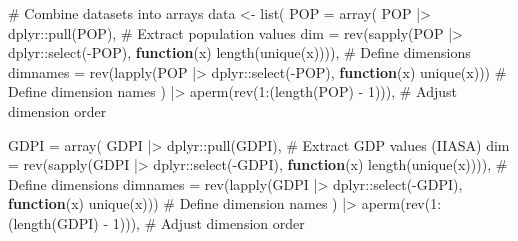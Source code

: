 \documentclass[
  letterpaper,
  DIV=11,
  numbers=noendperiod]{scrartcl}
\newenvironment{Shaded}{}{}
\newcommand{\AttributeTok}[1]{\textcolor[rgb]{0.00,0.34,0.68}{#1}}
\newcommand{\CommentTok}[1]{\textcolor[rgb]{0.54,0.53,0.53}{#1}}
\newcommand{\ControlFlowTok}[1]{\textcolor[rgb]{0.12,0.11,0.11}{\textbf{#1}}}
\newcommand{\DecValTok}[1]{\textcolor[rgb]{0.69,0.50,0.00}{#1}}
\newcommand{\FunctionTok}[1]{\textcolor[rgb]{0.39,0.29,0.61}{#1}}
\newcommand{\NormalTok}[1]{\textcolor[rgb]{0.12,0.11,0.11}{#1}}
\newcommand{\OtherTok}[1]{\textcolor[rgb]{0.00,0.43,0.16}{#1}}
\newcommand{\SpecialCharTok}[1]{\textcolor[rgb]{0.24,0.68,0.91}{#1}}
\begin{document}
\begin{Shaded}
\begin{Highlighting}[]
\CommentTok{\# Combine datasets into arrays}
\NormalTok{data }\OtherTok{\textless{}{-}} \FunctionTok{list}\NormalTok{(}
  \AttributeTok{POP =} \FunctionTok{array}\NormalTok{(}
\NormalTok{    POP }\SpecialCharTok{|\textgreater{}}\NormalTok{ dplyr}\SpecialCharTok{::}\FunctionTok{pull}\NormalTok{(POP),                                      }\CommentTok{\# Extract population values}
    \AttributeTok{dim =} \FunctionTok{rev}\NormalTok{(}\FunctionTok{sapply}\NormalTok{(POP }\SpecialCharTok{|\textgreater{}}\NormalTok{ dplyr}\SpecialCharTok{::}\FunctionTok{select}\NormalTok{(}\SpecialCharTok{{-}}\NormalTok{POP), }\ControlFlowTok{function}\NormalTok{(x) }\FunctionTok{length}\NormalTok{(}\FunctionTok{unique}\NormalTok{(x)))), }\CommentTok{\# Define dimensions}
    \AttributeTok{dimnames =} \FunctionTok{rev}\NormalTok{(}\FunctionTok{lapply}\NormalTok{(POP }\SpecialCharTok{|\textgreater{}}\NormalTok{ dplyr}\SpecialCharTok{::}\FunctionTok{select}\NormalTok{(}\SpecialCharTok{{-}}\NormalTok{POP), }\ControlFlowTok{function}\NormalTok{(x) }\FunctionTok{unique}\NormalTok{(x)))     }\CommentTok{\# Define dimension names}
\NormalTok{  ) }\SpecialCharTok{|\textgreater{}} \FunctionTok{aperm}\NormalTok{(}\FunctionTok{rev}\NormalTok{(}\DecValTok{1}\SpecialCharTok{:}\NormalTok{(}\FunctionTok{length}\NormalTok{(POP) }\SpecialCharTok{{-}} \DecValTok{1}\NormalTok{))),                           }\CommentTok{\# Adjust dimension order}
  
  \AttributeTok{GDPI =} \FunctionTok{array}\NormalTok{(}
\NormalTok{    GDPI }\SpecialCharTok{|\textgreater{}}\NormalTok{ dplyr}\SpecialCharTok{::}\FunctionTok{pull}\NormalTok{(GDPI),                                    }\CommentTok{\# Extract GDP values (IIASA)}
    \AttributeTok{dim =} \FunctionTok{rev}\NormalTok{(}\FunctionTok{sapply}\NormalTok{(GDPI }\SpecialCharTok{|\textgreater{}}\NormalTok{ dplyr}\SpecialCharTok{::}\FunctionTok{select}\NormalTok{(}\SpecialCharTok{{-}}\NormalTok{GDPI), }\ControlFlowTok{function}\NormalTok{(x) }\FunctionTok{length}\NormalTok{(}\FunctionTok{unique}\NormalTok{(x)))), }\CommentTok{\# Define dimensions}
    \AttributeTok{dimnames =} \FunctionTok{rev}\NormalTok{(}\FunctionTok{lapply}\NormalTok{(GDPI }\SpecialCharTok{|\textgreater{}}\NormalTok{ dplyr}\SpecialCharTok{::}\FunctionTok{select}\NormalTok{(}\SpecialCharTok{{-}}\NormalTok{GDPI), }\ControlFlowTok{function}\NormalTok{(x) }\FunctionTok{unique}\NormalTok{(x)))     }\CommentTok{\# Define dimension names}
\NormalTok{  ) }\SpecialCharTok{|\textgreater{}} \FunctionTok{aperm}\NormalTok{(}\FunctionTok{rev}\NormalTok{(}\DecValTok{1}\SpecialCharTok{:}\NormalTok{(}\FunctionTok{length}\NormalTok{(GDPI) }\SpecialCharTok{{-}} \DecValTok{1}\NormalTok{))),                          }\CommentTok{\# Adjust dimension order}
  

\end{Highlighting}
\end{Shaded}
\end{document}
